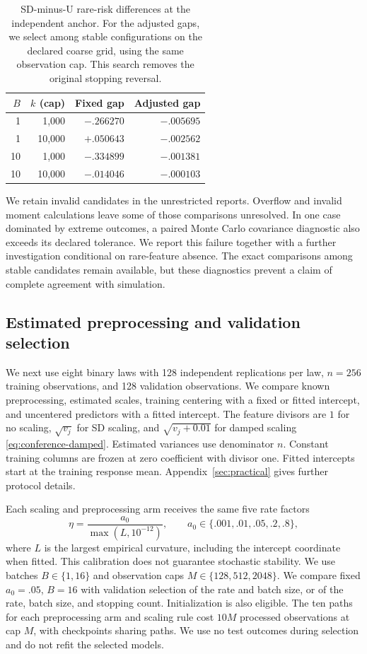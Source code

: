 \begin{table}[t]
 \centering
 \begin{tabular}{rrrr}
  \toprule
  $B$ & $k$ (cap) &  Fixed gap & Adjusted gap \\
  \midrule
    1 &     1,000 & $-.266270$ &   $-.005695$ \\
    1 &    10,000 & $+.050643$ &   $-.002562$ \\
   10 &     1,000 & $-.334899$ &   $-.001381$ \\
   10 &    10,000 & $-.014046$ &   $-.000103$ \\
  \bottomrule
 \end{tabular}
 \caption{
  SD-minus-U rare-risk differences at the independent anchor. For the adjusted
  gaps, we select among stable configurations on the declared coarse grid, using
  the same observation cap. This search removes the original stopping reversal.
 }
 \label{tab:conference-adjustment}
\end{table}

We retain invalid candidates in the unrestricted reports. Overflow and invalid
moment calculations leave some of those comparisons unresolved. In one case
dominated by extreme outcomes, a paired Monte Carlo covariance diagnostic also
exceeds its declared tolerance. We report this failure together with a further
investigation conditional on rare-feature absence. The exact comparisons among
stable candidates remain available, but these diagnostics prevent a claim of
complete agreement with simulation.

\subsection{Estimated preprocessing and validation selection}

We next use eight binary laws with 128 independent replications per law,
$n = 256$ training observations, and 128 validation observations. We compare
known preprocessing, estimated scales, training centering with a fixed or fitted
intercept, and uncentered predictors with a fitted intercept. The feature
divisors are $1$ for no scaling, $\sqrt{v_j}$ for SD scaling, and
$\sqrt{v_j + 0.01}$ for damped scaling \eqref{eq:conference-damped}. Estimated
variances use denominator $n$. Constant training columns are frozen at zero
coefficient with divisor one. Fitted intercepts start at the training response
mean. Appendix~\ref{sec:practical} gives further protocol details.

Each scaling and preprocessing arm receives the same five rate factors
\[
 \eta = \frac{a_0}{\max(L,10^{-12})},\qquad a_0 \in \{.001,.01,.05,.2,.8\},
\]
where $L$ is the largest empirical curvature, including the intercept coordinate
when fitted. This calibration does not guarantee stochastic stability. We use
batches $B \in \{1,16\}$ and observation caps $M \in \{128,512,2048\}$. We
compare fixed $a_0 = .05$, $B = 16$ with validation selection of the rate and
batch size, or of the rate, batch size, and stopping count. Initialization is
also eligible. The ten paths for each preprocessing arm and scaling rule cost
$10M$ processed observations at cap $M$, with checkpoints sharing paths. We use
no test outcomes during selection and do not refit the selected models.

